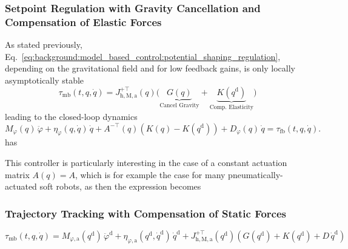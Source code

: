\subsubsection{Setpoint Regulation with Gravity Cancellation and Compensation of Elastic Forces}
As stated previously, Eq.~\ref{eq:background:model_based_control:potential_shaping_regulation}, depending on the gravitational field and for low feedback gains, is only locally asymptotically stable 
\begin{equation}
    \tau_\mathrm{mb}(t, q, \dot{q}) = J_{\mathrm{h},\mathrm{M},\mathrm{a}}^{+\top}(q) \big ( \underbrace{G(q)}_\text{Cancel Gravity} + \underbrace{K(q^\mathrm{d})}_\text{Comp. Elasticity} \big )
\end{equation}
leading to the closed-loop dynamics
\begin{equation}
    M_\varphi(q) \, \ddot{\varphi} + \eta_\varphi(q,\dot{q}) \, \dot{q} + A^{-\top}(q) \left ( K(q) - K(q^\mathrm{d}) \right ) + D_\varphi(q) \, \dot{q} = \tau_\mathrm{fb}(t, q, \dot{q}).
\end{equation}
\citet{pustina2022feedback} has 

This controller is particularly interesting in the case of a constant actuation matrix $A(q) = A$, which is for example the case for many pneumatically-actuated soft robots, as then the expression becomes

\subsubsection{Trajectory Tracking with Compensation of Static Forces}
\begin{equation}
    \tau_\mathrm{mb}(t, q, \dot{q}) = M_{\varphi,\mathrm{a}}(q^\mathrm{d}) \, \ddot{\varphi}^\mathrm{d} + \eta_{\varphi,\mathrm{a}}(q^\mathrm{d},\dot{q}^\mathrm{d}) \, \dot{q}^\mathrm{d} + J_{\mathrm{h},\mathrm{M},\mathrm{a}}^{+\top}(q^\mathrm{d}) \left ( G(q^\mathrm{d}) + K(q^\mathrm{d}) + D \, \dot{q}^\mathrm{d} \right )
\end{equation}



